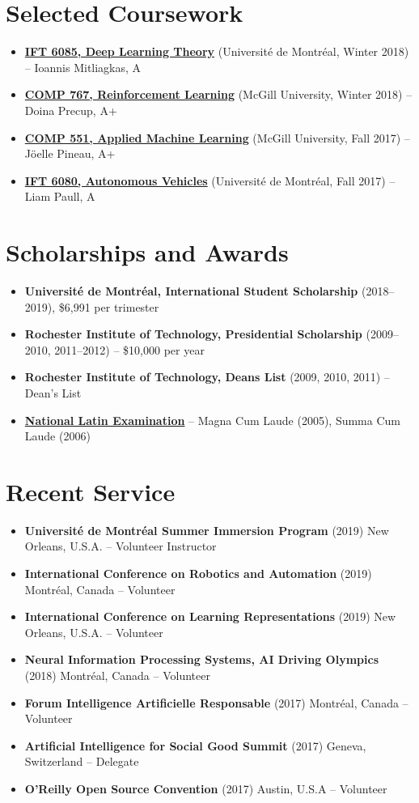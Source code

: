 \documentclass[letterpaper,11pt]{article}
\newcommand{\resumeItem}[2]{
\item\small{
\textbf{#1}{ #2 \vspace{-2pt}}
}
}
\newcommand{\resumeSubItem}[2]{\resumeItem{#1}{#2}}
\newcommand{\resumeSubHeadingListStart}{\begin{itemize}[leftmargin=*]}
\newcommand{\resumeSubHeadingListEnd}{\end{itemize}}
\begin{document}
\begin{justify}
\section{Selected Coursework}
\resumeSubHeadingListStart
\resumeSubItem{\href{http://mitliagkas.github.io/ift6085-dl-theory-class/}{IFT 6085, Deep Learning Theory}}{(Universit\'e de Montr\'eal, Winter 2018) -- Ioannis Mitliagkas, A}
\resumeSubItem{\href{https://www.cs.mcgill.ca/~dprecup/courses/rl.html}{COMP 767, Reinforcement Learning}}{(McGill University, Winter 2018) -- Doina Precup, A+}
\resumeSubItem{\href{https://www.cs.mcgill.ca/~jpineau/comp551/index.html}{COMP 551, Applied Machine Learning}}{(McGill University, Fall 2017) -- J\"oelle Pineau, A+}
\resumeSubItem{\href{http://liampaull.ca/courses/duckietown/index.html}{IFT 6080, Autonomous Vehicles}}{(Universit\'e de Montr\'eal, Fall 2017) -- Liam Paull, A}
\resumeSubHeadingListEnd

\section{Scholarships and Awards}
\resumeSubHeadingListStart
\resumeSubItem{Universit\'e de Montr\'eal, International Student Scholarship}{(2018--2019), \$6,991 per trimester}
\resumeSubItem{Rochester Institute of Technology, Presidential Scholarship}{(2009--2010, 2011--2012) -- \$10,000 per year}
\resumeSubItem{Rochester Institute of Technology, Deans List}{(2009, 2010, 2011) -- Dean's List}
\resumeSubItem{\href{https://www.nle.org/}{National Latin Examination}}{-- Magna Cum Laude (2005), Summa Cum Laude (2006)}
\resumeSubHeadingListEnd

\section{Recent Service}
\resumeSubHeadingListStart
\resumeSubItem{Universit\'e de Montr\'eal Summer Immersion Program}{(2019) New Orleans, U.S.A. -- Volunteer Instructor}
\resumeSubItem{International Conference on Robotics and Automation}{(2019)  Montr\'eal, Canada -- Volunteer}
\resumeSubItem{International Conference on Learning Representations}{(2019) New Orleans, U.S.A. -- Volunteer}
\resumeSubItem{Neural Information Processing Systems, AI Driving Olympics}{(2018) Montr\'eal, Canada -- Volunteer}
\resumeSubItem{Forum Intelligence Artificielle Responsable}{(2017) Montr\'eal, Canada -- Volunteer}
\resumeSubItem{Artificial Intelligence for Social Good Summit}{(2017) Geneva, Switzerland -- Delegate}
\resumeSubItem{O'Reilly Open Source Convention}{(2017) Austin, U.S.A -- Volunteer}
\resumeSubHeadingListEnd



\end{justify}
\end{document}
